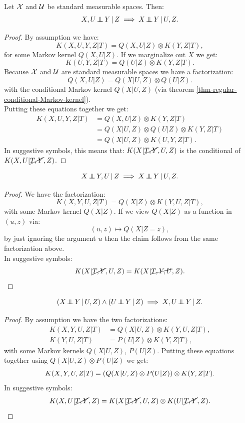 \begin{Lem} Let $\mathcal{X}$ and $\mathcal{U}$ be standard measurable spaces. Then:
    \[X , U \operatorname*{\perp\mkern-11mu\perp}  Y  \operatorname*{|} Z \implies X \operatorname*{\perp\mkern-11mu\perp}  Y \operatorname*{|} U,Z.\]
\begin{proof}
    By assumption we have:
    \[K(X,U,Y,Z|T) = Q(X,U|Z) \otimes K(Y,Z|T),\]
    for some Markov kernel $Q(X,U|Z)$. 
    If we marginalize out $X$ we get:
    \[K(U,Y,Z|T) = Q(U|Z) \otimes K(Y,Z|T).\]
    Because $\mathcal{X}$ and $\mathcal{U}$ are standard measurable spaces
    we have a factorization:
    \[ Q(X,U|Z) = Q(X|U,Z) \otimes Q(U|Z).\]
    with the conditional Markov kernel $Q(X|U,Z)$ (via theorem \ref{thm-regular-conditional-Markov-kernel}).\\
    Putting these equations together we get:
    \begin{align*}
        K(X,U,Y,Z|T) &= Q(X,U|Z) \otimes K(Y,Z|T)\\
                     &= Q(X|U,Z) \otimes Q(U|Z) \otimes K(Y,Z|T) \\
                     &= Q(X|U,Z) \otimes  K(U,Y,Z|T).
    \end{align*}
  In suggestive symbols, this means that:
  $K(X|\cancel{T,Y},U,Z)$ is the conditional of $K(X,U|\cancel{T,Y},Z)$.
\end{proof}
\end{Lem}

\begin{Lem} 
    \[X \operatorname*{\perp\mkern-11mu\perp}  Y , U \operatorname*{|} Z \implies X \operatorname*{\perp\mkern-11mu\perp}  Y \operatorname*{|} U , Z.\]
\begin{proof}
    We have the factorization:
    \[K(X,Y,U,Z|T) = Q(X|Z) \otimes K(Y,U,Z|T),\]
    with some Markov kernel $Q(X|Z)$. If we view $Q(X|Z)$ as a function in $(u,z)$ via:
    \[ (u,z) \mapsto Q(X|Z=z), \]
    by just ignoring the argument $u$ then the claim follows from the same factorization above.\\
    In suggestive symbols:
    \[K(X|\cancel{T,Y},U,Z) = K(X|\cancel{T,Y,U},Z).\]
\end{proof}
\end{Lem}

\begin{Lem} 
    \[ (X \operatorname*{\perp\mkern-11mu\perp}  Y \operatorname*{|} U , Z) \land (U \operatorname*{\perp\mkern-11mu\perp}  Y \operatorname*{|} Z) \implies X , U \operatorname*{\perp\mkern-11mu\perp}  Y \operatorname*{|} Z.\]
\begin{proof}
    By assumption we have the two factorizations:
    \begin{align*}
        K(X,Y,U,Z|T) & = Q(X|U,Z) \otimes K(Y,U,Z|T),\\
        K(Y,U,Z|T) & = P(U|Z) \otimes K(Y,Z|T),
    \end{align*}
    with some Markov kernels $Q(X|U,Z)$, $P(U|Z)$. Putting these equations together using $Q(X|U,Z) \otimes P(U|Z)$ we get:
    \[ K(X,Y,U,Z|T) = \left ( Q(X|U,Z) \otimes P(U|Z)\right ) \otimes K(Y,Z|T).\]
    In suggestive symbols:
    \[K(X,U|\cancel{T,Y},Z) = K(X|\cancel{T,Y},U,Z) \otimes K(U|\cancel{T,Y},Z).\]
\end{proof}
\end{Lem}

